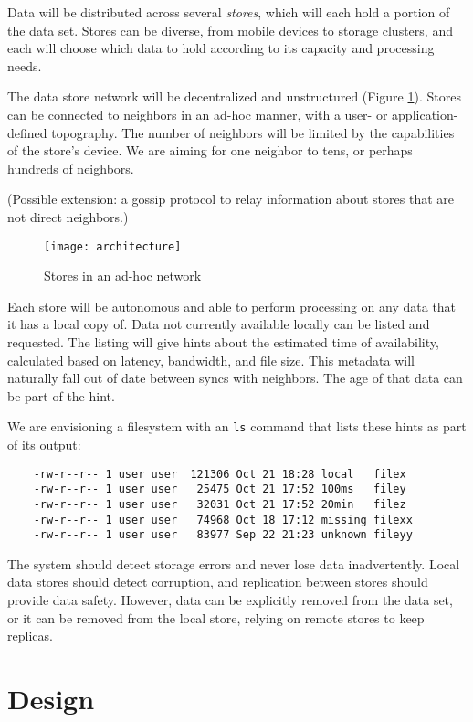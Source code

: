 \documentclass[a4paper]{article}
\newcommand{\newterm}{\textit}
\begin{document}
Data will be distributed across several \newterm{stores}, which will each hold a
portion of the data set. Stores can be diverse, from mobile devices to storage
clusters, and each will choose which data to hold according to its capacity and
processing needs.

The data store network will be decentralized and unstructured (Figure
\ref{fig:architecture}). Stores can be connected to neighbors in an ad-hoc
manner, with a user- or application-defined topography. The number of neighbors
will be limited by the capabilities of the store's device. We are aiming for one
neighbor to tens, or perhaps hundreds of neighbors.

(Possible extension: a gossip protocol to relay information about stores that
are not direct neighbors.)

\begin{figure}[h]
  \caption{Stores in an ad-hoc network}
  \label{fig:architecture}
  \centering
    \texttt{[image: architecture]}
\end{figure}

Each store will be autonomous and able to perform processing on any data that it
has a local copy of. Data not currently available locally can be listed and
requested. The listing will give hints about the estimated time of availability,
calculated based on latency, bandwidth, and file size. This metadata will
naturally fall out of date between syncs with neighbors. The age of that data
can be part of the hint.

We are envisioning a filesystem with an \lstinline{ls} command that lists these
hints as part of its output:

\begin{lstlisting}
    -rw-r--r-- 1 user user  121306 Oct 21 18:28 local   filex
    -rw-r--r-- 1 user user   25475 Oct 21 17:52 100ms   filey
    -rw-r--r-- 1 user user   32031 Oct 21 17:52 20min   filez
    -rw-r--r-- 1 user user   74968 Oct 18 17:12 missing filexx
    -rw-r--r-- 1 user user   83977 Sep 22 21:23 unknown fileyy
\end{lstlisting}

The system should detect storage errors and never lose data inadvertently. Local
data stores should detect corruption, and replication between stores should
provide data safety. However, data can be explicitly removed from the data set,
or it can be removed from the local store, relying on remote stores to keep
replicas.


\section{Design}\label{design}
\end{document}
